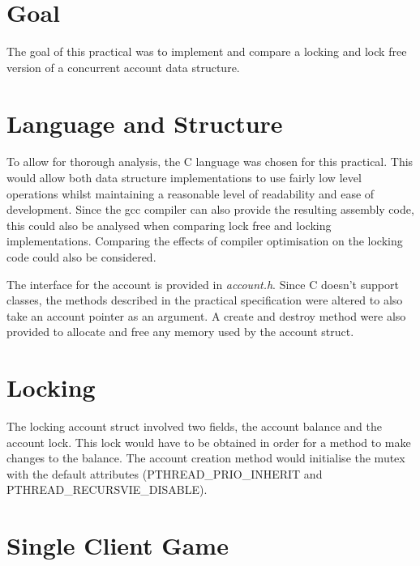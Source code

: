 \documentclass[12pt]{article}
\begin{document}
\part*{Goal}

The goal of this practical was to implement and compare a locking and lock free version of a concurrent account data structure.

\part{Language and Structure}

To allow for thorough analysis, the C language was chosen for this practical. This would allow both data structure implementations to use fairly low level operations whilst maintaining a reasonable level of readability and ease of development. Since the gcc compiler can also provide the resulting assembly code, this could also be analysed when comparing lock free and locking implementations. Comparing the effects of compiler optimisation on the locking code could also be considered. 

The interface for the account is provided in \emph{account.h}. Since C doesn't support classes, the methods described in the practical specification were altered to also take an account pointer as an argument. A create and destroy method were also provided to allocate and free any memory used by the account struct.

\part{Locking}

The locking account struct involved two fields, the account balance and the account lock. This lock would have to be obtained in order for a method to make changes to the balance. The account creation method would initialise the mutex with the default attributes (PTHREAD_PRIO_INHERIT and PTHREAD_RECURSVIE_DISABLE). 




\part{Single Client Game}
\end{document}
